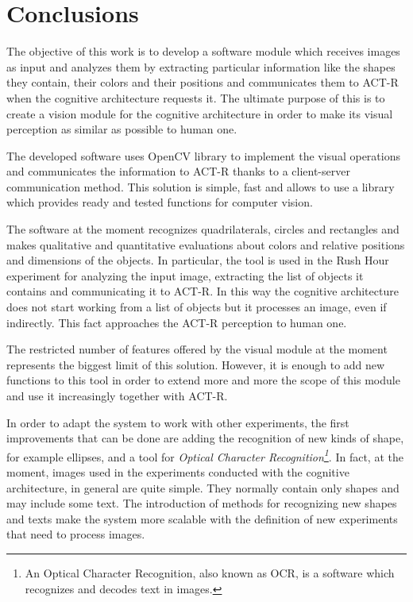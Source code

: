 \chapter{Conclusions}
	The objective of this work is to develop a software module which receives images as input and analyzes them by extracting particular information like the shapes they contain, their colors and their positions and communicates them to \mbox{ACT-R} when the cognitive architecture requests it. 
	The ultimate purpose of this is to create a vision module for the cognitive architecture in order to make its visual perception as similar as possible to human one.
	

	The developed software uses \mbox{OpenCV} library to implement the visual operations and communicates the information to \mbox{ACT-R} thanks to a client-server communication method. 
	This solution is simple, fast and allows to use a library which provides ready and tested functions for computer vision.  


	The software at the moment recognizes quadrilaterals, circles and rectangles and makes qualitative and quantitative evaluations about colors and relative positions and dimensions of the objects. 
	In particular, the tool is used in the Rush Hour experiment for analyzing the input image, extracting the list of objects it contains and communicating it to \mbox{ACT-R}. 
	In this way the cognitive architecture does not start working from a list of objects but it processes an image, even if indirectly.
	This fact approaches the \mbox{ACT-R} perception to human one. 	
		

	The restricted number of features offered by the visual module at the moment represents the biggest limit of this solution.
	However, it is enough to add new functions to this tool in order to extend more and more the scope of this module and use it increasingly together with \mbox{ACT-R}.


	In order to adapt the system to work with other experiments, the first improvements that can be done are adding the recognition of new kinds of shape, for example ellipses, and a tool for \emph{{Optical Character Recognition\footnote{An Optical Character Recognition, also known as OCR, is a software which recognizes and decodes text in images.}}}.
	In fact, at the moment, images used in the experiments conducted with the cognitive architecture, in general are quite simple.
	They normally contain only shapes and may include some text.
	The introduction of methods for recognizing new shapes and texts make the system more scalable with the definition  of new experiments that need to process images.


